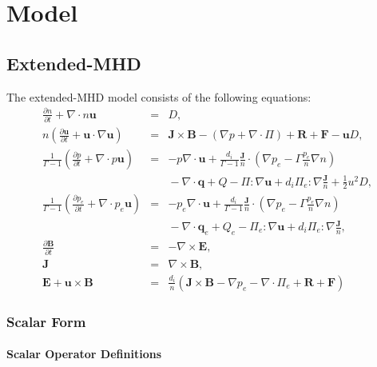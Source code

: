 \documentclass[letterpaper]{book}
\newcommand{\ddt}[1]{\frac{\partial #1}{\partial t}}
\renewcommand{\vec}[1]{\ensuremath{\mathbf{#1}}}
\newcommand{\tensor}[1]{\mathsf{#1}}
\newcommand{\B}{\vec{B}}
\newcommand{\E}{\vec{E}}
\newcommand{\R}{\vec{R}}
\renewcommand{\u}{\vec{u}}
\newcommand{\F}{\vec{F}}
\renewcommand{\j}{\vec{J}}
\newcommand{\q}{\vec{q}}
\newcommand{\jn}{\frac{\j}{n}}
\renewcommand{\P}{\tensor{\Pi}}
\renewcommand{\div}[1]{\nabla \cdot #1}
\newcommand{\curl}[1]{\nabla \times #1}
\newcommand{\dotdot}{:}
\begin{document}
\chapter{Model}

\section{Extended-MHD}

The extended-MHD model consists of the following equations:
\begin{subequations} \label{eq:xmhd}
\begin{eqnarray}
  \label{eq:continuity}
  \ddt{n} + \div n \u & = & D,
  \\
  \label{eq:momentum}
  n \left( \ddt{\u} + \u \cdot \nabla \u \right) 
  & = & \j \times \B - (\nabla p + \div \P) + \R + \F - \u D,
  \\
  \frac{1}{\Gamma-1} \left( \ddt{p} + \div{p\u} \right)
  & = & -p \div\u +
  \frac{d_i}{\Gamma-1}\jn\cdot\left(\nabla p_e -
  \Gamma \frac{p_e}{n}\nabla n \right)
  \\ & & \mbox{}
  - \div{\q} + Q - \P\dotdot\nabla \u + d_i \P_e\dotdot\nabla \jn + \frac{1}{2} u^2 D,
  \nonumber \\
  \frac{1}{\Gamma-1} \left( \ddt{p_e} + \div{p_e\u} \right)
  & = & -p_e \div\u +
  \frac{d_i}{\Gamma-1}\jn\cdot\left(\nabla p_e -
  \Gamma \frac{p_e}{n}\nabla n \right)
  \\ & & \mbox{} 
  - \div{\q_e} + Q_e - \P_e\dotdot\nabla \u + d_i \P_e\dotdot\nabla \jn,
  \nonumber 
  \\
  \label{eq:Faraday}
  \ddt{\B} & = & -\curl \E,
  \\
  \j & = &\curl \B,
  \\
  \label{eq:ohm}
  \E + \u \times \B & = &  
  \frac{d_i}{n} \left(\j\times\B - \nabla p_e 
  - \div{\P_e} + \R + \F \right)
\end{eqnarray}
\end{subequations}


\subsection{Scalar Form}

\subsubsection{Scalar Operator Definitions}
\end{document}
